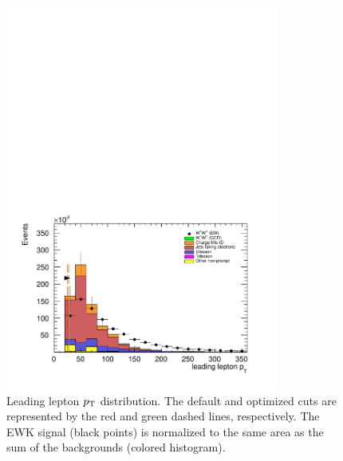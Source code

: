 \begin{figure}[htp]
  \centering
  \includegraphics[width=0.8\textwidth]{figs/ssww_upgrade/optimization_plots/lep0pt}
  \caption{Leading lepton $p_{\mathrm{T}}$ distribution.  The default and optimized cuts are represented by the red and green dashed lines, respectively.  The \ssww EWK signal (black points) is normalized to the same area as the sum of the backgrounds (colored histogram).}
  \label{fig:optimized_lep0pt}
\end{figure}

